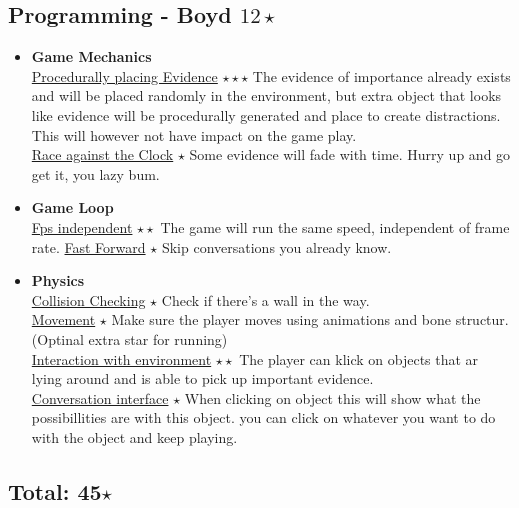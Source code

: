 \documentclass{article}
\begin{document}
		\subsection{Programming - Boyd $12 \star$}
			\begin{itemize}
				\item \textbf{Game Mechanics}\\
					\underline{Procedurally placing Evidence} $\star \star \star$ The evidence of importance already exists and will be placed randomly in the environment, but extra object that looks like evidence will be procedurally generated and place to create distractions. This will however not have impact on the game play.\\
					\underline{Race against the Clock} $\star$ Some evidence will fade with time. Hurry up and go get it, you lazy bum.
				\item \textbf{Game Loop}\\
					\underline{Fps independent} $\star \star$ The game will run the same speed, independent of frame rate.
					\underline{Fast Forward} $\star$ Skip conversations you already know.
				\item \textbf{Physics}\\
					\underline{Collision Checking} $\star$ Check if there's a wall in the way.\\
					\underline{Movement} $\star$ Make sure the player moves using animations and bone structur. (Optinal extra star for running)\\
					\underline{Interaction with environment} $\star \star$ The player can klick on objects that ar lying around and is able to pick up important evidence.\\
					\underline{Conversation interface} $\star$ When clicking on object this will show what the possibillities are with this object. you can click on whatever you want to do with the object and keep playing.
			\end{itemize}

			\subsection*{Total: 45$\star$}

			
\end{document}
